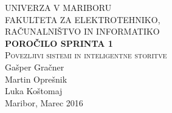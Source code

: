 \documentclass[a4paper,11pt]{article}
\begin{document}
\begin{titlepage}


\newcommand{\HRule}{\rule{\linewidth}{0.5mm}} %

\center %
 

\textsc{ UNIVERZA V MARIBORU\\ FAKULTETA ZA ELEKTROTEHNIKO,\\RAČUNALNIŠTVO IN INFORMATIKO}\\[5cm] %

{ \huge \bfseries \textbf{POROČILO SPRINTA 1}}\\[0.4cm] %
\textsc{\large Povezljivi sistemi in inteligentne storitve}\\[5cm] %

{\large Gašper Gračner}\\[0.4cm]
{\large Martin Oprešnik}\\[0.4cm]
{\large Luka Koštomaj}\\[0.4cm] 

\vfill %
{\large Maribor, Marec 2016}\\[3cm] %
\end{titlepage}
\newpage

\end{document}

